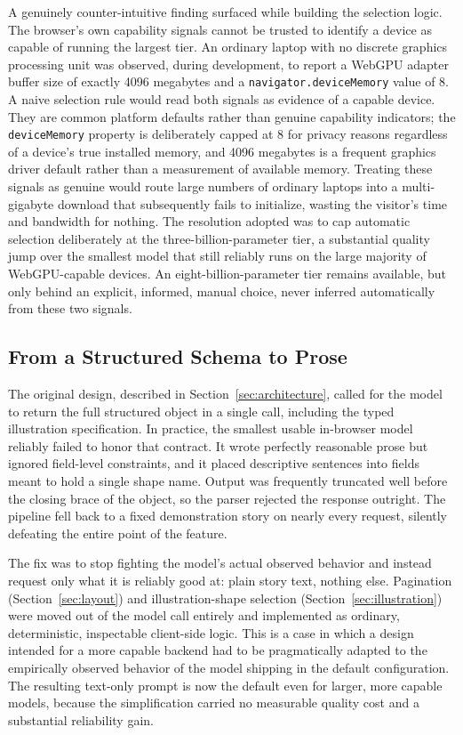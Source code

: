 \documentclass[conference]{IEEEtran}
\begin{document}
A genuinely counter-intuitive finding surfaced while building the selection logic. The browser's own capability signals cannot be trusted to identify a device as capable of running the largest tier. An ordinary laptop with no discrete graphics processing unit was observed, during development, to report a WebGPU adapter buffer size of exactly 4096 megabytes and a \texttt{navigator.deviceMemory} value of 8. A naive selection rule would read both signals as evidence of a capable device. They are common platform defaults rather than genuine capability indicators; the \texttt{deviceMemory} property is deliberately capped at 8 for privacy reasons regardless of a device's true installed memory, and 4096 megabytes is a frequent graphics driver default rather than a measurement of available memory. Treating these signals as genuine would route large numbers of ordinary laptops into a multi-gigabyte download that subsequently fails to initialize, wasting the visitor's time and bandwidth for nothing. The resolution adopted was to cap automatic selection deliberately at the three-billion-parameter tier, a substantial quality jump over the smallest model that still reliably runs on the large majority of WebGPU-capable devices. An eight-billion-parameter tier remains available, but only behind an explicit, informed, manual choice, never inferred automatically from these two signals.

\subsection{From a Structured Schema to Prose}

The original design, described in Section~\ref{sec:architecture}, called for the model to return the full structured object in a single call, including the typed illustration specification. In practice, the smallest usable in-browser model reliably failed to honor that contract. It wrote perfectly reasonable prose but ignored field-level constraints, and it placed descriptive sentences into fields meant to hold a single shape name. Output was frequently truncated well before the closing brace of the object, so the parser rejected the response outright. The pipeline fell back to a fixed demonstration story on nearly every request, silently defeating the entire point of the feature.

The fix was to stop fighting the model's actual observed behavior and instead request only what it is reliably good at: plain story text, nothing else. Pagination (Section~\ref{sec:layout}) and illustration-shape selection (Section~\ref{sec:illustration}) were moved out of the model call entirely and implemented as ordinary, deterministic, inspectable client-side logic. This is a case in which a design intended for a more capable backend had to be pragmatically adapted to the empirically observed behavior of the model shipping in the default configuration. The resulting text-only prompt is now the default even for larger, more capable models, because the simplification carried no measurable quality cost and a substantial reliability gain.
\end{document}
